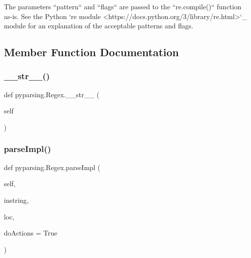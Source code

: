 \begin{DoxyVerb}The parameters ``pattern`` and ``flags`` are passed
to the ``re.compile()`` function as-is. See the Python
`re module <https://docs.python.org/3/library/re.html>`_ module for an
explanation of the acceptable patterns and flags.
\end{DoxyVerb}
 

\subsection{Member Function Documentation}
\mbox{\label{classpyparsing_1_1Regex_a3d6bf00b8b8327de50d45b28dba62166}} 
\subsubsection{\texorpdfstring{\+\_\+\+\_\+str\+\_\+\+\_\+()}{\_\_str\_\_()}}
{\footnotesize\ttfamily def pyparsing.\+Regex.\+\_\+\+\_\+str\+\_\+\+\_\+ (\begin{DoxyParamCaption}\item[{}]{self }\end{DoxyParamCaption})}

\mbox{\label{classpyparsing_1_1Regex_a582c5e478eb35d197f455116efb7fd38}} 
\subsubsection{\texorpdfstring{parse\+Impl()}{parseImpl()}}
{\footnotesize\ttfamily def pyparsing.\+Regex.\+parse\+Impl (\begin{DoxyParamCaption}\item[{}]{self,  }\item[{}]{instring,  }\item[{}]{loc,  }\item[{}]{do\+Actions = {\ttfamily True} }\end{DoxyParamCaption})}

\mbox{\label{classpyparsing_1_1Regex_aba5fff9cb8e4eaaa7eca1da894a9b2a1}} 

